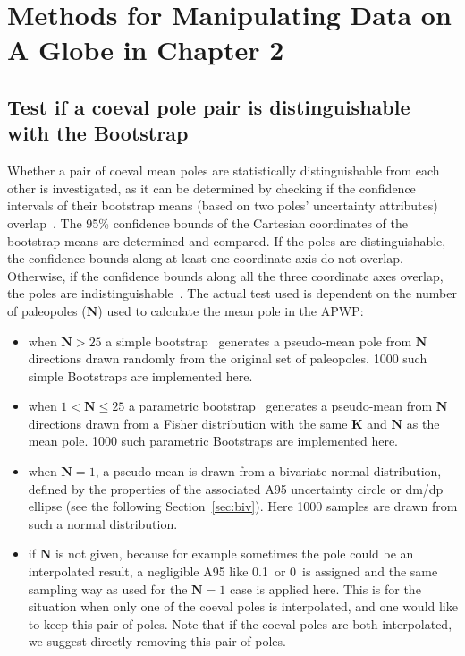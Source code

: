 \chapter{Methods for Manipulating Data on A Globe in Chapter 2}\label{appen4chp2}

\section{Test if a coeval pole pair is distinguishable with the Bootstrap}
Whether a pair of coeval mean poles are statistically distinguishable from each
other is investigated, as it can be determined by checking if the confidence
intervals of their bootstrap means (based on two poles' uncertainty attributes)
overlap~\citep{T91}. The 95\% confidence bounds of the Cartesian coordinates of
the bootstrap means are determined and compared. If the poles are
distinguishable, the confidence bounds along at least one coordinate axis do not
overlap. Otherwise, if the confidence bounds along all the three coordinate axes
overlap, the poles are indistinguishable~\citep{T91}. The actual test used is
dependent on the number of paleopoles ($\mathbf{N}$) used to calculate the mean
pole in the APWP$\colon$

\begin{itemize}
\item when $\mathbf{N}>25$ a simple bootstrap~\citep{T91} generates a
pseudo-mean pole from $\mathbf{N}$ directions drawn randomly from the original
set of paleopoles. 1000 such simple Bootstraps are implemented here.
\item when $1<\mathbf{N}\leq25$ a parametric bootstrap~\citep{T91} generates a
pseudo-mean from $\mathbf{N}$ directions drawn from a Fisher distribution with
the same $\mathbf{K}$ and $\mathbf{N}$ as the mean pole. 1000 such parametric
Bootstraps are implemented here.
\item when $\mathbf{N}=1$, a pseudo-mean is drawn from a bivariate normal
distribution, defined by the properties of the associated A95 uncertainty
circle or dm/dp ellipse (see the following Section~\ref{sec:biv}). Here 1000
samples are drawn from such a normal distribution.
\item if $\mathbf{N}$ is not given, because for example sometimes the pole could
be an interpolated result, a negligible A95 like 0.1\degree\ or 0\degree\ is
assigned and the same sampling way as used for the $\mathbf{N}=1$ case is
applied here. This is for the situation when only one of the coeval poles is
interpolated, and one would like to keep this pair of poles. Note that if the
coeval poles are both interpolated, we suggest directly removing this pair of
poles.
\end{itemize}

